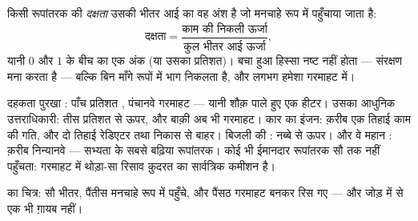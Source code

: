 \begin{definition}[दक्षता]\label{def:g9:energy-conversions:efficiency}
किसी रूपांतरक की \emph{दक्षता} उसकी भीतर आई  का वह
अंश है जो मनचाहे रूप में पहुँचाया जाता है:
\[
\text{दक्षता} =
\frac{\text{काम की निकली ऊर्जा}}{\text{कुल भीतर आई ऊर्जा}},
\]
यानी $0$ और $1$ के बीच का एक अंक (या उसका प्रतिशत)। बचा हुआ हिस्सा
नष्ट नहीं होता --- संरक्षण मना करता है --- बल्कि बिन माँगे रूपों में
भाग निकलता है, और लगभग हमेशा गरमाहट में।
\end{definition}

\begin{example}[रिपोर्ट कार्ड]\label{ex:g9:energy-conversions:reportcards}
दहकता पुरखा : पाँच प्रतिशत , पंचानवे गरमाहट --- यानी शौक़
पाले हुए एक हीटर। उसका आधुनिक उत्तराधिकारी: तीस प्रतिशत से ऊपर, और
बाक़ी अब भी गरमाहट। कार का इंजन: क़रीब एक तिहाई काम की गति, और दो
तिहाई रेडिएटर तथा निकास से बाहर। बिजली की : नब्बे से ऊपर। और वे
महान : क़रीब निन्यानवे --- सभ्यता के सबसे बढ़िया
रूपांतरक। कोई भी ईमानदार रूपांतरक सौ तक नहीं पहुँचता: गरमाहट में
थोड़ा-सा रिसाव क़ुदरत का सार्वत्रिक कमीशन है।
\end{example}

\begin{omfigure}

{\small {} का चित्र: सौ  भीतर, पैंतीस मनचाहे रूप में पहुँचे,
और पैंसठ गरमाहट बनकर रिस गए --- और जोड़ में से एक भी  ग़ायब नहीं।}
\end{omfigure}

